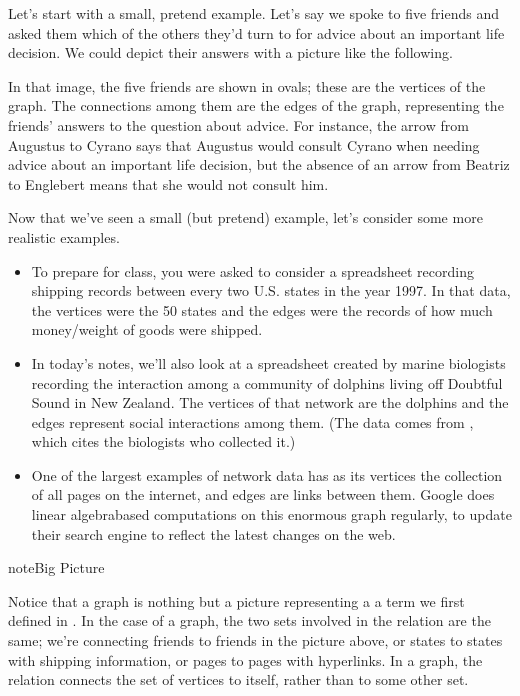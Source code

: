 \documentclass[letterpaper,10pt,english]{sphinxmanual}
\begin{document}
Let’s start with a small, pretend example.  Let’s say we spoke to five friends and asked them which of the others they’d turn to for advice about an important life decision.  We could depict their answers with a picture like the following.


In that image, the five friends are shown in ovals; these are the vertices of the graph.  The connections among them are the edges of the graph, representing the friends’ answers to the question about advice.  For instance, the arrow from Augustus to Cyrano says that Augustus would consult Cyrano when needing advice about an important life decision, but the absence of an arrow from Beatriz to Englebert means that she would not consult him.

Now that we’ve seen a small (but pretend) example, let’s consider some more realistic examples.
\begin{itemize}
\item {} 
To prepare for class, you were asked to consider a spreadsheet recording shipping records between every two U.S. states in the year 1997.  In that data, the vertices were the 50 states and the edges were the records of how much money/weight of goods were shipped.

\item {} 
In today’s notes, we’ll also look at a spreadsheet created by marine biologists recording the interaction among a community of dolphins living off Doubtful Sound in New Zealand.  The vertices of that network are the dolphins and the edges represent social interactions among them.  (The data comes from , which cites the biologists who collected it.)

\item {} 
One of the largest examples of network data has as its vertices the collection of all pages on the internet, and edges are links between them.  Google does linear algebra\sphinxhyphen{}based computations on this enormous graph regularly, to update their search engine to reflect the latest changes on the web.

\end{itemize}

\begin{sphinxadmonition}{note}{Big Picture}

Notice that a graph is nothing but a picture representing a  a term we first defined in {\hyperref[\detokenize{chapter-2-mathematical-foundations::doc}]{}}.  In the case of a graph, the two sets involved in the relation are the same; we’re connecting friends to friends in the picture above, or states to states with shipping information, or pages to pages with hyperlinks.  In a graph, the relation connects the set of vertices to itself, rather than to some other set.
\end{sphinxadmonition}
\end{document}
